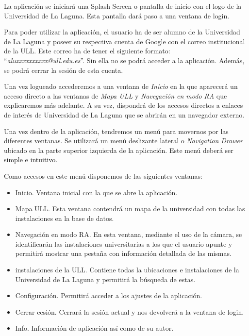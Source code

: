 La aplicación se iniciará una Splash Screen \cite{URL::SplashScreen} o pantalla de inicio con el logo de la Universidad de La Laguna. Esta pantalla dará paso a una ventana de login.

Para poder utilizar la aplicación, el usuario ha de ser alumno de la Universidad de La Laguna y poseer su respectiva cuenta de Google con el correo institucional de la ULL. Este correo ha de tener el siguiente formato: ``\textit{aluxxxxxxxxxx@ull.edu.es}''. Sin ella no se podrá acceder a la aplicación. Además, se podrá cerrar la sesión de esta cuenta.

Una vez logueado accederemos a una ventana de \textit{Inicio} en la que aparecerá un acceso directo a las ventanas de \textit{Mapa ULL} y \textit{Navegación en modo RA} que explicaremos más adelante. A su vez, dispondrá de los accesos directos a enlaces de interés de Universidad de La Laguna que se abrirán en un navegador externo.

Una vez dentro de la aplicación, tendremos un menú para movernos por las diferentes ventanas. Se utilizará un menú deslizante lateral o \textit{Navigation Drawer} \cite{URL::NavigationDraw} ubicado en la parte superior izquierda de la aplicación. Este menú deberá ser simple e intuitivo.

Como accesos en este menú disponemos de las siguientes ventanas:

\begin{itemize}
    \item Inicio. Ventana inicial con la que se abre la aplicación.
    \item Mapa ULL. Esta ventana contendrá un mapa de la universidad con todas las instalaciones en la base de datos. 
    \item Navegación en modo RA. En esta ventana, mediante el uso de la cámara, se identificarán las instalaciones universitarias a los que el usuario apunte y permitirá mostrar una pestaña con información detallada de las mismas.
    \item instalaciones de la ULL. Contiene todas la ubicaciones e instalaciones de la Universidad de La Laguna y permitirá la búsqueda de estas. 
    \item Configuración. Permitirá acceder a los ajustes de la aplicación.
    \item Cerrar cesión. Cerrará la sesión actual y nos devolverá a la ventana de login.
    \item Info. Información de aplicación así como de su autor.
\end{itemize}

